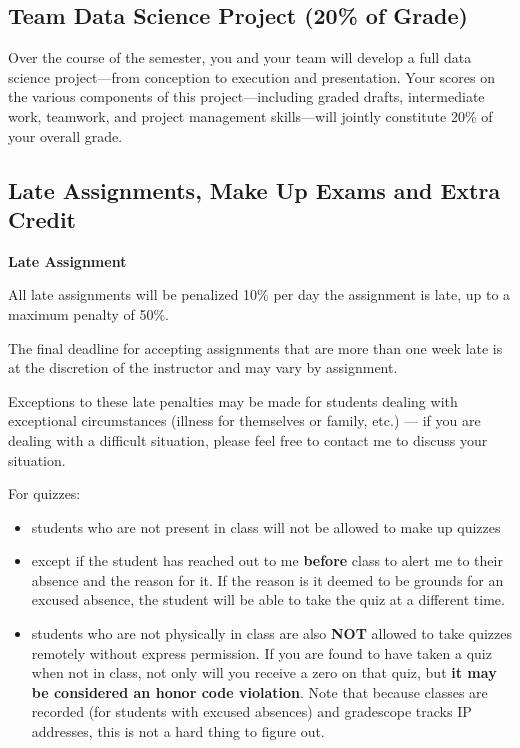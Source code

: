 \documentclass[12pt]{article}
\begin{document}
\subsection{Team Data Science Project (20\% of Grade)}

Over the course of the semester, you and your team will develop a full data science project—from conception to execution and presentation. Your scores on the various components of this project—including graded drafts, intermediate work, teamwork, and project management skills—will jointly constitute 20\% of your overall grade.

\subsection{Late Assignments, Make Up Exams and Extra Credit}

\textbf{Late Assignment}

All late assignments will be penalized 10\% per day the assignment is late, up to a maximum penalty of 50\%.

The final deadline for accepting assignments that are more than one week late is at the discretion of the instructor and may vary by assignment. 

Exceptions to these late penalties may be made for students dealing with exceptional circumstances (illness for themselves or family, etc.) — if you are dealing with a difficult situation, please feel free to contact me to discuss your situation.

For quizzes: 

\begin{itemize}
	\item students who are not present in class will not be allowed to make up quizzes
	\item except if the student has reached out to me \textbf{before} class to alert me to their absence and the reason for it. If the reason is it deemed to be grounds for an excused absence, the student will be able to take the quiz at a different time.
	\item students who are not physically in class are also \textbf{NOT} allowed to take quizzes remotely without express permission. If you are found to have taken a quiz when not in class, not only will you receive a zero on that quiz, but \textbf{it may be considered an honor code violation}. Note that because classes are recorded (for students with excused absences) and gradescope tracks IP addresses, this is not a hard thing to figure out.
\end{itemize}
\end{document}
